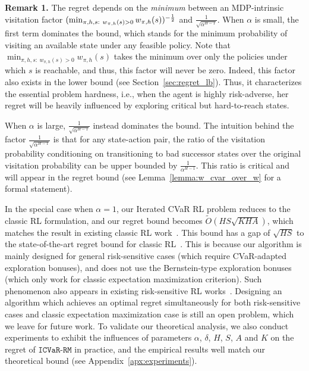 \documentclass{article} %
\newcommand{\algcvar}{\mathtt{ICVaR\mbox{-}RM}}
\begin{document}
	
	\textbf{Remark 1.}
	The regret depends on the \emph{minimum} between an MDP-intrinsic visitation factor $(\min_{\begin{subarray}{c}\pi,h,s:\  w_{\pi,h}(s)>0\end{subarray}} w_{\pi,h}(s))^{-\frac{1}{2}}$ and  $\frac{1}{\sqrt{\alpha^{H-1}}}$.  
	When $\alpha$ is small, the first term %
	dominates the bound, which stands for the minimum probability of visiting an available state under any feasible policy. 
	Note that $\min_{\pi,h,s:\ w_{\pi,h}(s)>0} w_{\pi,h}(s)$ takes the minimum over only the policies under which $s$ is reachable, and thus, this factor will never be zero. Indeed, this factor also exists in the lower bound (see Section~\ref{sec:regret_lb}). Thus, it characterizes the essential problem hardness, i.e., when the agent is highly risk-adverse, her regret will be heavily influenced by exploring critical but hard-to-reach states. 
	
	When $\alpha$ is large, $\frac{1}{\sqrt{\alpha^{H-1}}}$ instead dominates the bound. The intuition behind the factor $\frac{1}{\sqrt{\alpha^{H-1}}}$ is that for any state-action pair, the ratio of the visitation probability conditioning on transitioning to bad successor states over the original visitation probability can be upper bounded by $\frac{1}{\alpha^{H-1}}$. This ratio is critical and will appear in the regret bound (see Lemma~\ref{lemma:w_cvar_over_w} for a formal statement). 
	
	In the special case when $\alpha=1$, our Iterated CVaR RL problem reduces to the classic RL formulation, and our regret bound becomes $\tilde{O}( HS \sqrt{KHA} )$, which matches the result in existing classic RL work~\citep{jaksch2010near}. This bound has a gap of $\sqrt{HS}$ to the state-of-the-art regret bound for classic RL~\citep{azar2017minimax,zanette2019tighter}. This is because our algorithm is mainly designed for general risk-sensitive cases (which require CVaR-adapted exploration bonuses), and does not use the Bernstein-type exploration bonuses (which only work for classic expectation maximization criterion). Such phenomenon also appears in existing risk-sensitive RL works~\citep{fei2020near_optimal,fei2021exponential}. Designing an algorithm which achieves an optimal regret simultaneously for both risk-sensitive cases and classic expectation maximization case is still an open problem, which we leave for future work.  
	To validate our theoretical analysis, we also conduct experiments to exhibit the influences of parameters $\alpha$, $\delta$, $H$, $S$, $A$ and $K$ on the regret of $\algcvar$ in practice, and the empirical results well match our theoretical bound (see Appendix~\ref{apx:experiments}). 
	
\end{document}
